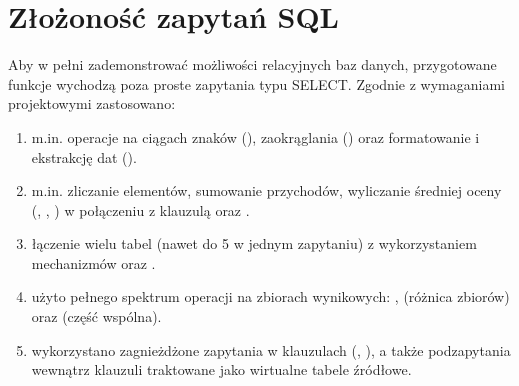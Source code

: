 \documentclass[letterpaper,10pt,polish]{sphinxmanual}
\begin{document}
\section{Złożoność zapytań SQL}
\label{\detokenize{rozdzia_u0142_5/BD_Zapytania/index:zlozonosc-zapytan-sql}}
\sphinxAtStartPar
Aby w pełni zademonstrować możliwości relacyjnych baz danych, przygotowane funkcje wychodzą poza proste zapytania typu SELECT. Zgodnie z wymaganiami projektowymi zastosowano:
\begin{enumerate}
%
\item {} 
\sphinxAtStartPar
{} m.in. operacje na ciągach znaków (), zaokrąglania () oraz formatowanie i ekstrakcję dat ().

\item {} 
\sphinxAtStartPar
{} m.in. zliczanie elementów, sumowanie przychodów, wyliczanie średniej oceny (, , ) w połączeniu z klauzulą  oraz .

\item {} 
\sphinxAtStartPar
{} łączenie wielu tabel (nawet do 5 w jednym zapytaniu) z wykorzystaniem mechanizmów  oraz .

\item {} 
\sphinxAtStartPar
{} użyto pełnego spektrum operacji na zbiorach wynikowych: ,  (różnica zbiorów) oraz  (część wspólna).

\item {} 
\sphinxAtStartPar
{} wykorzystano zagnieżdżone zapytania w klauzulach  (, ), a także podzapytania wewnątrz klauzuli  traktowane jako wirtualne tabele źródłowe.

\end{enumerate}
\end{document}
